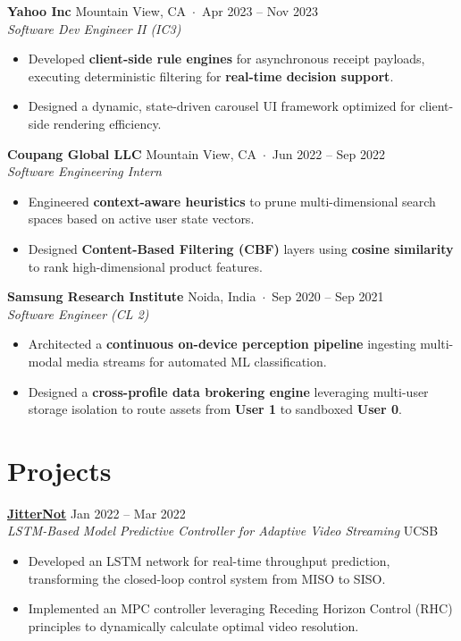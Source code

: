 \documentclass[10pt,letterpaper]{article}
\begin{document}
\noindent
\textbf{Yahoo Inc} \hfill Mountain View, CA \,$\cdot$\, Apr 2023 – Nov 2023 \\
\textit{Software Dev Engineer II (IC3)} 
\begin{itemize}
    \item Developed \textbf{client-side rule engines} for asynchronous receipt payloads, executing deterministic filtering for \textbf{real-time decision support}.
    \item Designed a dynamic, state-driven carousel UI framework optimized for client-side rendering efficiency.
\end{itemize}

\noindent
\textbf{Coupang Global LLC} \hfill Mountain View, CA \,$\cdot$\, Jun 2022 – Sep 2022 \\
\textit{Software Engineering Intern} 
\begin{itemize}
    \item Engineered \textbf{context-aware heuristics} to prune multi-dimensional search spaces based on active user state vectors.
    \item Designed \textbf{Content-Based Filtering (CBF)} layers using \textbf{cosine similarity} to rank high-dimensional product features.
\end{itemize}

\noindent
\textbf{Samsung Research Institute} \hfill Noida, India \,$\cdot$\, Sep 2020 – Sep 2021 \\
\textit{Software Engineer (CL 2)} 
\begin{itemize}
    \item Architected a \textbf{continuous on-device perception pipeline} ingesting multi-modal media streams for automated ML classification.
    \item Designed a \textbf{cross-profile data brokering engine} leveraging multi-user storage isolation to route assets from \textbf{User 1} to sandboxed \textbf{User 0}.
\end{itemize}


\section*{Projects}

\noindent
\textbf{\href{https://satyam-aw.github.io/projects/jitternot/}{JitterNot}} \hfill Jan 2022 – Mar 2022 \\
\textit{LSTM-Based Model Predictive Controller for Adaptive Video Streaming}  \hfill UCSB
\begin{itemize}
    \item Developed an LSTM network for real-time throughput prediction, transforming the closed-loop control system from MISO to SISO.
    \item Implemented an MPC controller leveraging Receding Horizon Control (RHC) principles to dynamically calculate optimal video resolution.
\end{itemize}
\end{document}

